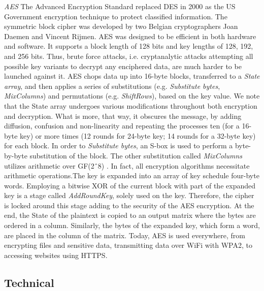 \textit{AES} The Advanced Encryption Standard replaced DES in 2000 as the US Government encryption technique to protect classified information. The symmetric block cipher was developed by two Belgian cryptographers Joan Daemen and Vincent Rijmen. AES was designed to be efficient in both hardware and software. It supports a block length of 128 bits and key lengths of 128, 192, and 256 bits. Thus, brute force attacks, i.e. cryptanalytic attacks attempting all possible key variants to decrypt any enciphered data, are much harder to be launched against it. AES chops data up into 16-byte blocks, transferred to a \emph{State array}, and then applies a series of substitutions (e.g. \emph{Substitute bytes}, \emph{MixColumns}) and permutations (e.g. \emph{ShiftRows}), based on the key value. We note that the State array undergoes various modifications throughout both encryption and decryption. What is more, that way, it obscures the message, by adding diffusion, confusion and non-linearity and repeating the processes ten (for a 16-byte key) or more times (12 rounds for 24-byte key; 14 rounds for a 32-byte key) for each block. In order to \emph{Substitute bytes}, an S-box is used to perform a byte-by-byte substitution of the block. The other substitution called \emph{MixColumns} utilizes arithmetic over GF(2ˆ8) \cite{stallings2017-a}. In fact, all encryption algorithms necessitate arithmetic operations.The key is expanded into an array of key schedule four-byte words. Employing a bitwise XOR of the current block with part of the expanded key is a stage called \emph{AddRoundKey}, solely used on the key. Therefore, the cipher is locked around this stage adding to the security of the AES encryption.  At the end, the State of the plaintext is copied to an output matrix where the bytes are ordered in a column. Similarly, the bytes of the expanded key, which form a word, are placed in the column of the matrix. Today, AES is used everywhere, from encrypting files and sensitive data, transmitting data over WiFi with WPA2, to accessing websites using HTTPS. 

\subsection{Technical}


